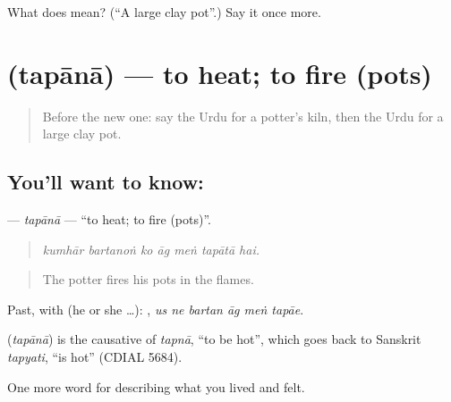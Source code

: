 \begin{tcolorbox}[breakable,colback=teal!4,colframe=teal!35!black,title={Before you move on}]
What does  mean? (\textquotedblleft{}A large clay pot\textquotedblright{}.) Say it once more.
\end{tcolorbox}
\section[\texorpdfstring{\ur{تپانا} (tapānā)}{تپانا (tapānā)}]{ (tapānā) — to heat; to fire (pots)}

\label{lesson:UR-C498-tapana}



\begin{quote}
Before the new one: say the Urdu for a potter's kiln, then the Urdu for a large clay pot.
\end{quote}

\subsection*{You'll want to know: }
\textbf{} — \emph{tapānā} — \textquotedblleft{}to heat; to fire (pots)\textquotedblright{}.

\begin{quote}
      
\end{quote}

\begin{quote}
\emph{kumhār bartanoṅ ko āg meṅ tapātā hai.}
\end{quote}

\begin{quote}
The potter fires his pots in the flames.
\end{quote}

Past, with  (he or she …):      , \emph{us ne bartan āg meṅ tapāe}.

\begin{cousinweb}
\textbf{} (\emph{tapānā}) is the causative of \emph{tapnā}, \textquotedblleft{}to be hot\textquotedblright{}, which goes back to Sanskrit \emph{tapyati}, \textquotedblleft{}is hot\textquotedblright{} (CDIAL 5684).
\end{cousinweb}

\begin{grammarlens}[title={What you've built}]
One more word for describing what you lived and felt.
\end{grammarlens}


